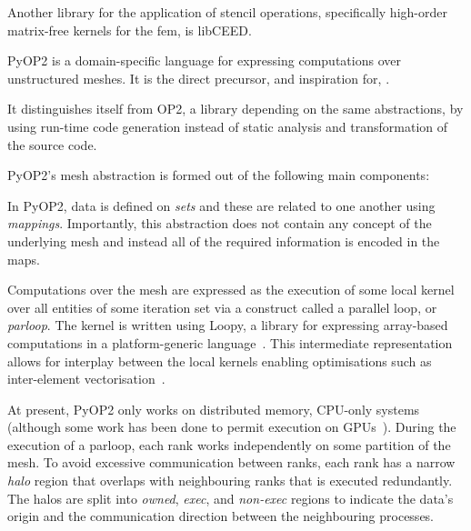 
Another library for the application of stencil operations, specifically high-order matrix-free kernels for the \gls{fem}, is libCEED.

PyOP2 is a domain-specific language for expressing computations over unstructured meshes.
It is the direct precursor, and inspiration for, \projectname.

It distinguishes itself from OP2, a library depending on the same abstractions, by using run-time code generation instead of static analysis and transformation of the source code.

PyOP2's mesh abstraction is formed out of the following main components:


In PyOP2, data is defined on \textit{sets} and these are related to one another using \textit{mappings}.
Importantly, this abstraction does not contain any concept of the underlying mesh and instead all of the required information is encoded in the maps.

  Computations over the mesh are expressed as the execution of some local kernel over all entities of some iteration set via a construct called a parallel loop, or \textit{parloop}.
  The kernel is written using Loopy, a library for expressing array-based computations in a platform-generic language~\cite{klocknerLooPyTransformationbased2014}.
  This intermediate representation allows for interplay between the local kernels enabling optimisations such as inter-element vectorisation~\cite{sunStudyVectorizationMatrixfree2020}.

  At present, PyOP2 only works on distributed memory, CPU-only systems (although some work has been done to permit execution on GPUs~\cite{fenics2021-kulkarni}).
  During the execution of a parloop, each rank works independently on some partition of the mesh.
  To avoid excessive communication between ranks, each rank has a narrow \textit{halo} region that overlaps with neighbouring ranks that is executed redundantly.
  The halos are split into \textit{owned}, \textit{exec}, and \textit{non-exec} regions to indicate the data's origin and the communication direction between the neighbouring processes.


